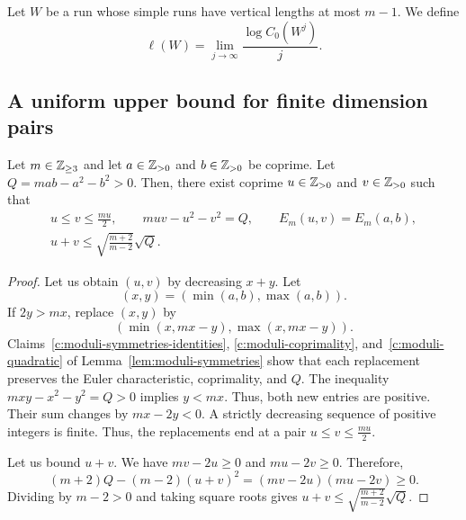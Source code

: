 \begin{definition}\label{def:periodic-growth-rate}
Let $W$ be a run whose simple runs have vertical lengths at most $m-1$.
We define
\[
 \ell(W)=\lim_{j\to\infty}\frac{\log C_0(W^j)}{j}.
\]
\end{definition}

\subsection{A uniform upper bound for finite dimension pairs}
\begin{lemma}\label{lem:dimension-reduction}
Let $m\in\mathbb Z_{\ge3}$ and let $a\in\mathbb Z_{>0}$ and $b\in\mathbb Z_{>0}$ be coprime.
Let $Q=mab-a^2-b^2>0$.
Then, there exist coprime $u\in\mathbb Z_{>0}$ and $v\in\mathbb Z_{>0}$ such that
\[
\begin{gathered}
 u\le v\le\frac{mu}{2},\qquad muv-u^2-v^2=Q,\qquad E_m(u,v)=E_m(a,b),\\
 u+v\le\sqrt{\frac{m+2}{m-2}}\sqrt Q.
\end{gathered}
\]
\end{lemma}
\begin{proof}
Let us obtain $(u,v)$ by decreasing $x+y$.
Let
\[
 (x,y)=(\min(a,b),\max(a,b)).
\]
If $2y>mx$, replace $(x,y)$ by
\[
 (\min(x,mx-y),\max(x,mx-y)).
\]
Claims~\ref{c:moduli-symmetries-identities}, \ref{c:moduli-coprimality}, and~\ref{c:moduli-quadratic}
of Lemma~\ref{lem:moduli-symmetries} show that each replacement preserves
the Euler characteristic, coprimality, and $Q$.
The inequality $mxy-x^2-y^2=Q>0$ implies $y<mx$.
Thus, both new entries are positive.
Their sum changes by $mx-2y<0$.
A strictly decreasing sequence of positive integers is finite. Thus, the replacements end at a pair
$u\le v\le\frac{mu}{2}$.

Let us bound $u+v$.
We have $mv-2u\ge0$ and $mu-2v\ge0$.
Therefore,
\[
 (m+2)Q-(m-2)(u+v)^2=(mv-2u)(mu-2v)\ge0.
\]
Dividing by $m-2>0$ and taking square roots gives $u+v\le\sqrt{\frac{m+2}{m-2}}\sqrt Q$.
\end{proof}

